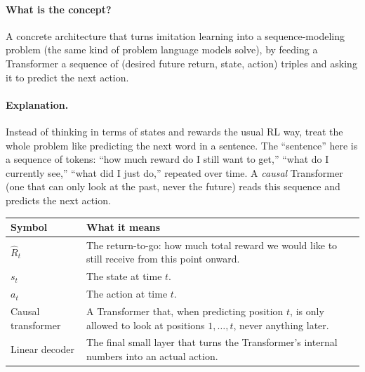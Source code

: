\documentclass[11pt]{article}
\begin{document}
\paragraph{What is the concept?}
A concrete architecture that turns imitation learning into a sequence-modeling problem
(the same kind of problem language models solve), by feeding a Transformer a sequence
of (desired future return, state, action) triples and asking it to predict the next
action.

\paragraph{Explanation.}
Instead of thinking in terms of states and rewards the usual RL way, treat the whole
problem like predicting the next word in a sentence. The ``sentence'' here is a sequence
of tokens: ``how much reward do I still want to get,'' ``what do I currently see,''
``what did I just do,'' repeated over time. A \emph{causal} Transformer (one that can
only look at the past, never the future) reads this sequence and predicts the next
action.

\begin{center}
\begin{tabular}{@{}p{3.2cm}p{10.3cm}@{}}
\toprule
Symbol & What it means \\
\midrule
$\hat R_t$ & The return-to-go: how much total reward we would like to still receive from
this point onward. \\
$s_t$ & The state at time $t$. \\
$a_t$ & The action at time $t$. \\
Causal transformer & A Transformer that, when predicting position $t$, is only allowed
to look at positions $1,\ldots,t$, never anything later. \\
Linear decoder & The final small layer that turns the Transformer's internal numbers
into an actual action. \\
\bottomrule
\end{tabular}
\end{center}
\end{document}
